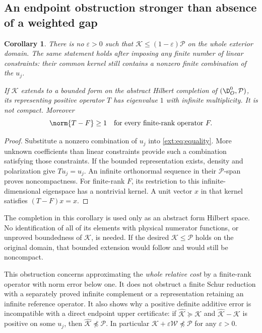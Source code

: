 \documentclass[11pt,a4paper]{article}
\numberwithin{equation}{section}
\newtheorem{corollary}[theorem]{Corollary}
\theoremstyle{definition}\newtheorem{definition}[theorem]{Definition}
\theoremstyle{remark}\newtheorem{remark}[theorem]{Remark}
\begin{document}
\subsection{An endpoint obstruction stronger than absence of a weighted gap}
\begin{corollary}\label{ext:cor:critical}
There is no $\varepsilon>0$ such that $\mathcal K\le(1-\varepsilon)\mathcal P$ on the whole exterior domain. The same statement holds after imposing any finite number of linear constraints: their common kernel still contains a nonzero finite combination of the $u_j$.

If $\mathcal K$ extends to a bounded form on the abstract Hilbert completion of $(\D_O^0,\mathcal P)$, its representing positive operator $T$ has eigenvalue $1$ with infinite multiplicity. It is not compact. Moreover
\begin{equation}\label{ext:eq:essential}
 \norm{T-F}\ge1\quad\hbox{for every finite-rank operator }F.
\end{equation}
\end{corollary}
\begin{proof}
Substitute a nonzero combination of $u_j$ into \eqref{ext:eq:equality}. More unknown coefficients than linear constraints provide such a combination satisfying those constraints. If the bounded representation exists, density and polarization give $Tu_j=u_j$. An infinite orthonormal sequence in their $\mathcal P$-span proves noncompactness. For finite-rank $F$, its restriction to this infinite-dimensional eigenspace has a nontrivial kernel. A unit vector $x$ in that kernel satisfies $(T-F)x=x$.
\end{proof}
The completion in this corollary is used only as an abstract form Hilbert space. No identification of all of its elements with physical numerator functions, or unproved boundedness of $\mathcal K$, is needed. If the desired $\mathcal K\le\mathcal P$ holds on the original domain, that bounded extension would follow and would still be noncompact.

This obstruction concerns approximating the \emph{whole relative cost} by a finite-rank operator with norm error below one. It does not obstruct a finite Schur reduction with a separately proved infinite complement or a representation retaining an infinite reference operator.
It also shows why a positive definite additive error is incompatible with a direct endpoint upper certificate: if $\widehat{\mathcal K}\succeq\mathcal K$ and $\widehat{\mathcal K}-\mathcal K$ is positive on some $u_j$, then $\widehat{\mathcal K}\npreceq\mathcal P$. In particular $\mathcal K+\varepsilon\mathcal W\npreceq\mathcal P$ for any $\varepsilon>0$.
\end{document}

